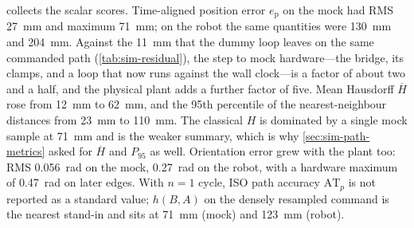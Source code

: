  collects the scalar scores. Time-aligned position
error $e_{\mathrm{p}}$ on the mock had RMS \qty{27}{\milli\meter} and
maximum \qty{71}{\milli\meter}; on the robot the same quantities were
\qty{130}{\milli\meter} and \qty{204}{\milli\meter}. Against the
\qty{11}{\milli\meter} that the dummy loop leaves on the same commanded
path (\cref{tab:sim-residual}), the step to mock hardware---the bridge,
its clamps, and a loop that now runs against the wall clock---is a
factor of about two and a half, and the physical plant adds a further
factor of five. Mean Hausdorff
$\overline{H}$ rose from \qty{12}{\milli\meter} to
\qty{62}{\milli\meter}, and the 95th percentile of the nearest-neighbour
distances from \qty{23}{\milli\meter} to \qty{110}{\milli\meter}. The
classical $H$ is dominated by a single mock sample at
\qty{71}{\milli\meter} and is the weaker summary, which is why
\cref{sec:sim-path-metrics} asked for $\overline{H}$ and $P_{95}$ as
well. Orientation error grew with the plant too: RMS
\qty{0.056}{\radian} on the mock, \qty{0.27}{\radian} on the robot, with
a hardware maximum of \qty{0.47}{\radian} on later edges. With
$n=1$ cycle, ISO path accuracy $\mathrm{AT}_{p}$ is not reported as a
standard value; $h(B,A)$ on the densely resampled command is the nearest
stand-in and sits at \qty{71}{\milli\meter} (mock) and
\qty{123}{\milli\meter} (robot).

